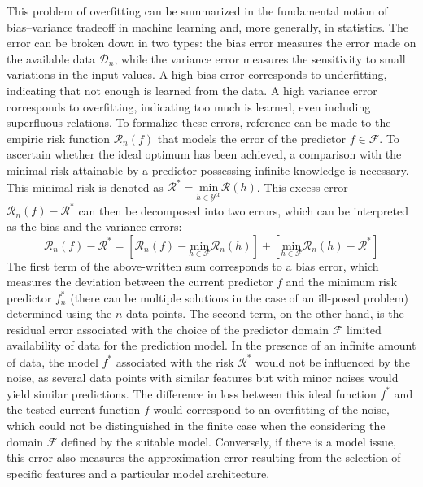 \documentclass[main]{subfiles}
\begin{document}
This problem of overfitting can be summarized in the fundamental notion of bias--variance tradeoff in machine learning and, more generally, in statistics. The error can be broken down in two types: the bias error measures the error made on the available data $\mathcal{D}_n$, while the variance error measures the sensitivity to small variations in the input values. A high bias error corresponds to underfitting, indicating that not enough is learned from the data. A high variance error corresponds to overfitting, indicating too much is learned, even including superfluous relations. To formalize these errors, reference can be made to the empiric risk function $\mathcal{R}_n(f)$ that models the error of the predictor $f\in\mathcal{F}$. To ascertain whether the ideal optimum has been achieved, a comparison with the minimal risk attainable by a predictor possessing infinite knowledge is necessary. This minimal risk is denoted as $\mathcal{R}^* = \underset{\scriptscriptstyle h\in\mathcal{Y}^{\mathcal{X}}} {\text{min}}\mathcal{R}(h)$. This excess error $\mathcal{R}_n(f)-\mathcal{R}^*$ can then be decomposed into two errors, which can be interpreted as the bias and the variance errors:
\begin{equation}\label{eq:generalization_error}
  \mathcal{R}_n(f)-\mathcal{R}^* = \left[\mathcal{R}_n(f) - \underset{\scriptstyle h\in\mathcal{F}} {\text{min}}\mathcal{R}_n(h)\right] + \left[\underset{\scriptstyle h\in\mathcal{F}} {\text{min}}\mathcal{R}_n(h) -\mathcal{R}^*\right]
\end{equation}
The first term of the above-written sum corresponds to a bias error, which measures the deviation between the current predictor $f$ and the minimum risk predictor $f_n^*$ (there can be multiple solutions in the case of an ill-posed problem) determined using the $n$ data points. The second term, on the other hand, is the residual error associated with the choice of the predictor domain $\mathcal{F}$  limited availability of data for the prediction model. In the presence of an infinite amount of data, the model $f^*$ associated with the risk $\mathcal{R}^*$ would not be influenced by the noise, as several data points with similar features but with minor noises would yield similar predictions. The difference in loss between this ideal function $f^*$ and the tested current function $f$ would correspond to an overfitting of the noise, which could not be distinguished in the finite case when the considering the domain $\mathcal{F}$ defined by the suitable model. Conversely, if there is a model issue, this error also measures the approximation error resulting from the selection of specific features and a particular model architecture.
\end{document}
